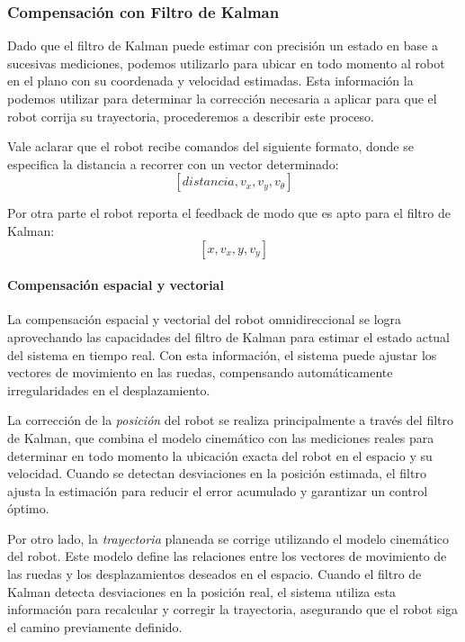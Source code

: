 \subsubsection{Compensación con Filtro de Kalman}

Dado que el filtro de Kalman puede estimar con precisión un estado en base a sucesivas mediciones, podemos utilizarlo para ubicar en todo momento al robot en el plano con su coordenada y velocidad estimadas. Esta información la podemos utilizar para determinar la corrección necesaria a aplicar para que el robot corrija su trayectoria, procederemos a describir este proceso.

Vale aclarar que el robot recibe comandos del siguiente formato, donde se especifica la distancia a recorrer con un vector determinado:
$$ [distancia, v_x, v_y, v_\theta] $$

Por otra parte el robot reporta el feedback de modo que es apto para el filtro de Kalman:
$$ [x, v_x, y, v_y] $$

\paragraph{Compensación espacial y vectorial} \mbox{} \vspace{8pt}

La compensación espacial y vectorial del robot omnidireccional se logra aprovechando las capacidades del filtro de Kalman para estimar el estado actual del sistema en tiempo real. Con esta información, el sistema puede ajustar los vectores de movimiento en las ruedas, compensando automáticamente irregularidades en el desplazamiento.

La corrección de la \textit{posición} del robot se realiza principalmente a través del filtro de Kalman, que combina el modelo cinemático con las mediciones reales para determinar en todo momento la ubicación exacta del robot en el espacio y su velocidad. Cuando se detectan desviaciones en la posición estimada, el filtro ajusta la estimación para reducir el error acumulado y garantizar un control óptimo.

Por otro lado, la \textit{trayectoria} planeada se corrige utilizando el modelo cinemático del robot. Este modelo define las relaciones entre los vectores de movimiento de las ruedas y los desplazamientos deseados en el espacio. Cuando el filtro de Kalman detecta desviaciones en la posición real, el sistema utiliza esta información para recalcular y corregir la trayectoria, asegurando que el robot siga el camino previamente definido.

